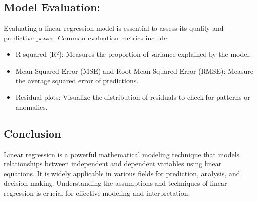 \documentclass[
  letterpaper,
  DIV=11,
  numbers=noendperiod]{scrartcl}
\providecommand{\tightlist}{%
  \setlength{\itemsep}{0pt}\setlength{\parskip}{0pt}}\usepackage{longtable,booktabs,array}
\begin{document}
\subsection{Model Evaluation:}\label{model-evaluation}

Evaluating a linear regression model is essential to assess its quality
and predictive power. Common evaluation metrics include:

\begin{itemize}
\tightlist
\item
  R-squared (R²): Measures the proportion of variance explained by the
  model.
\item
  Mean Squared Error (MSE) and Root Mean Squared Error (RMSE): Measure
  the average squared error of predictions.
\item
  Residual plots: Visualize the distribution of residuals to check for
  patterns or anomalies.
\end{itemize}

\subsection{Conclusion}\label{conclusion}

Linear regression is a powerful mathematical modeling technique that
models relationships between independent and dependent variables using
linear equations. It is widely applicable in various fields for
prediction, analysis, and decision-making. Understanding the assumptions
and techniques of linear regression is crucial for effective modeling
and interpretation.
\end{document}
